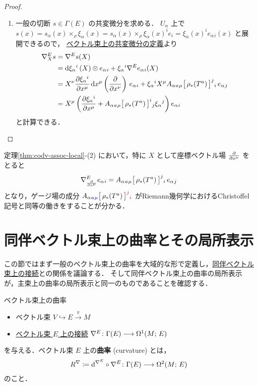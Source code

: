 \documentclass[geometry_main]{subfiles}
\begin{document}
\begin{proof}
\begin{enumerate}
        \item 
        一般の切断 $s \in \Gamma(E)$ の共変微分を求める．
        $U_\alpha$ 上で $s(x) = s_\alpha(x) \times_\rho \xi_\alpha(x) = s_\alpha(x) \times_\rho \xi_\alpha(x)^i e_i = \xi_\alpha(x)^i e_\alpha{}_i(x)$ と展開できるので，
        \hyperref[def:connection-vect]{ベクトル束上の共変微分の定義}より
        \begin{align}
            \nabla^E_X s
            &= \nabla^E s(X) \\
            &= \dd{\xi_\alpha{}^i}(X) \otimes e_\alpha{}_i + \xi_\alpha{}^i \nabla^E e_\alpha{}_i(X) \\
            &= X^\nu \pdv{\xi_\alpha{}^{i}}{x^\mu} \dd{x^\mu} \left( \pdv{}{x^\nu} \right)\, e_\alpha{}_i  + \xi_\alpha{}^i X^\mu A_\alpha{}_a{}_\mu \bigl[\, \rho_* (T^a) \,\bigr]^j{}_i\,  e_\alpha{}_j \\
            &= X^\mu \left( \pdv{\xi_\alpha{}^{i}}{x^\mu} + A_\alpha{}_a{}_\mu \bigl[\, \rho_* (T^a) \,\bigr]^i{}_j \xi_\alpha{}^j \right) e_\alpha{}_i
        \end{align}
        と計算できる．
    \end{enumerate}

\end{proof}
                
定理\ref{thm:codv-assoc-local}-(2) において，特に $X$ として座標ベクトル場 $\pdv{}{x^\mu}$ をとると
\begin{align}
    \nabla^E_{\pdv{}{x^\mu}} e_\alpha{}_i = A_\alpha{}_a{}_\mu \bigl[\, \rho_* (T^a) \,\bigr]^j{}_i\,  e_\alpha{}_j
\end{align}
となり，ゲージ場の成分 $A_\alpha{}_a{}_{\textcolor{blue}{\mu}} \bigl[\, \rho_* (T^a) \,\bigr]^{\textcolor{red}{j}}{}_{\textcolor{red}{i}}$ がRiemann幾何学におけるChristoffel記号と同等の働きをすることが分かる．

\section{同伴ベクトル束上の曲率とその局所表示}

この節ではまず一般のベクトル束上の曲率を大域的な形で定義し，\hyperref[thm:connection-assoc]{同伴ベクトル束上の接続}との関係を議論する．
そして同伴ベクトル束上の曲率の局所表示が，主束上の曲率の局所表示と同一のものであることを確認する．

\begin{mydef}[label=def:curvature-vect]{ベクトル束上の曲率}
    \begin{itemize}
        \item ベクトル束 $V \hookrightarrow E \xrightarrow{\pi} M$
        \item \hyperref[def:connection-vect]{ベクトル束 $E$ 上の接続} $\nabla^E \colon \Gamma(E) \longrightarrow \Omega^1(M;\, E)$
    \end{itemize}
    を与える．ベクトル束 $E$ 上の\textbf{曲率} (curvature) とは，
    \begin{align}
        R^\nabla \coloneqq \dd^{\nabla^E} \circ \nabla^E \colon \Gamma(E) \longrightarrow \Omega^2(M;\, E)
    \end{align}
    のこと．
\end{mydef}
\end{document}
